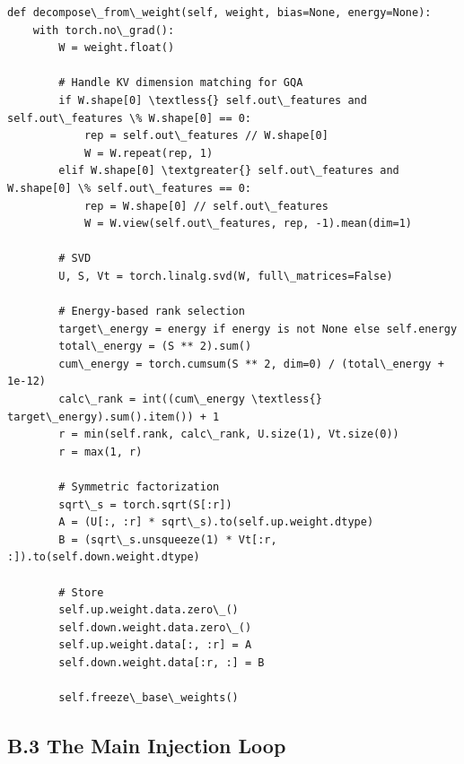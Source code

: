 \begin{lstlisting}
def decompose\_from\_weight(self, weight, bias=None, energy=None):
    with torch.no\_grad():
        W = weight.float()
        
        # Handle KV dimension matching for GQA
        if W.shape[0] \textless{} self.out\_features and self.out\_features \% W.shape[0] == 0:
            rep = self.out\_features // W.shape[0]
            W = W.repeat(rep, 1)
        elif W.shape[0] \textgreater{} self.out\_features and W.shape[0] \% self.out\_features == 0:
            rep = W.shape[0] // self.out\_features
            W = W.view(self.out\_features, rep, -1).mean(dim=1)
        
        # SVD
        U, S, Vt = torch.linalg.svd(W, full\_matrices=False)
        
        # Energy-based rank selection
        target\_energy = energy if energy is not None else self.energy
        total\_energy = (S ** 2).sum()
        cum\_energy = torch.cumsum(S ** 2, dim=0) / (total\_energy + 1e-12)
        calc\_rank = int((cum\_energy \textless{} target\_energy).sum().item()) + 1
        r = min(self.rank, calc\_rank, U.size(1), Vt.size(0))
        r = max(1, r)
        
        # Symmetric factorization
        sqrt\_s = torch.sqrt(S[:r])
        A = (U[:, :r] * sqrt\_s).to(self.up.weight.dtype)
        B = (sqrt\_s.unsqueeze(1) * Vt[:r, :]).to(self.down.weight.dtype)
        
        # Store
        self.up.weight.data.zero\_()
        self.down.weight.data.zero\_()
        self.up.weight.data[:, :r] = A
        self.down.weight.data[:r, :] = B
        
        self.freeze\_base\_weights()
\end{lstlisting}

\subsection{B.3 The Main Injection Loop}

